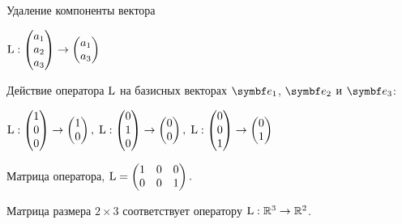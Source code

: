 \begin{frame}{Удаление компоненты вектора}


$\operatorname{L} : \begin{pmatrix}
  a_1 \\
  a_2 \\
  a_3 \\
\end{pmatrix} \to 
\begin{pmatrix}
  a_1 \\
  a_3 \\
\end{pmatrix}$

\pause

Действие оператора $\operatorname{L}$ на базисных векторах $\be_1$, $\be_2$ и $\be_3$:

$\operatorname{L} : \begin{pmatrix}
  1 \\
  0 \\
  0 \\
\end{pmatrix} \to 
\begin{pmatrix}
1  \\
0  \\
\end{pmatrix}, \;
\operatorname{L} : \begin{pmatrix}
  0 \\
  1 \\
  0 \\
\end{pmatrix} \to 
\begin{pmatrix}
0 \\
0 \\
\end{pmatrix}, \;
\operatorname{L} : \begin{pmatrix}
  0 \\
  0 \\
  1 \\
\end{pmatrix} \to 
\begin{pmatrix}
0 \\
1 \\
\end{pmatrix}$

\pause

Матрица оператора, $\operatorname{L} = 
\begin{pmatrix}
  1 & 0 & 0 \\
  0 & 0 & 1 \\
\end{pmatrix}.$


Матрица размера $2\times 3$ соответствует оператору $\operatorname{L}: \mathbb{R}^3 \to \mathbb{R}^2$.


\end{frame}
    







